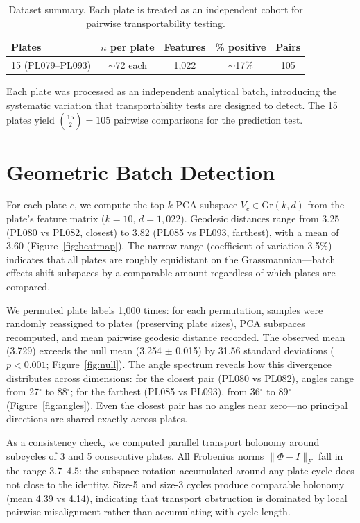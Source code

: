 \documentclass{article}
\begin{document}
\begin{table}[t]
\centering
\caption{Dataset summary. Each plate is treated as an independent cohort for pairwise transportability testing.}
\label{tab:cohorts}
\begin{tabular}{lcccc}
\toprule
Plates & $n$ per plate & Features & \% positive & Pairs \\
\midrule
15 (PL079--PL093) & $\sim$72 each & 1{,}022 & $\sim$17\% & 105 \\
\bottomrule
\end{tabular}
\end{table}

Each plate was processed as an independent analytical batch, introducing the systematic variation that transportability tests are designed to detect. The 15 plates yield $\binom{15}{2} = 105$ pairwise comparisons for the prediction test.


\section{Geometric Batch Detection}
\label{sec:batch}

For each plate $c$, we compute the top-$k$ PCA subspace $V_c \in \mathrm{Gr}(k, d)$ from the plate's feature matrix ($k = 10$, $d = 1{,}022$). Geodesic distances range from 3.25 (PL080 vs PL082, closest) to 3.82 (PL085 vs PL093, farthest), with a mean of 3.60 (Figure~\ref{fig:heatmap}). The narrow range (coefficient of variation 3.5\%) indicates that all plates are roughly equidistant on the Grassmannian---batch effects shift subspaces by a comparable amount regardless of which plates are compared.

We permuted plate labels 1{,}000 times: for each permutation, samples were randomly reassigned to plates (preserving plate sizes), PCA subspaces recomputed, and mean pairwise geodesic distance recorded. The observed mean (3.729) exceeds the null mean (3.254 $\pm$ 0.015) by 31.56 standard deviations ($p < 0.001$; Figure~\ref{fig:null}). The angle spectrum reveals how this divergence distributes across dimensions: for the closest pair (PL080 vs PL082), angles range from 27$^\circ$ to 88$^\circ$; for the farthest (PL085 vs PL093), from 36$^\circ$ to 89$^\circ$ (Figure~\ref{fig:angles}). Even the closest pair has no angles near zero---no principal directions are shared exactly across plates.

As a consistency check, we computed parallel transport holonomy around subcycles of 3 and 5 consecutive plates. All Frobenius norms $\|\Phi - I\|_F$ fall in the range $3.7$--$4.5$: the subspace rotation accumulated around any plate cycle does not close to the identity. Size-5 and size-3 cycles produce comparable holonomy (mean 4.39 vs 4.14), indicating that transport obstruction is dominated by local pairwise misalignment rather than accumulating with cycle length.
\end{document}

